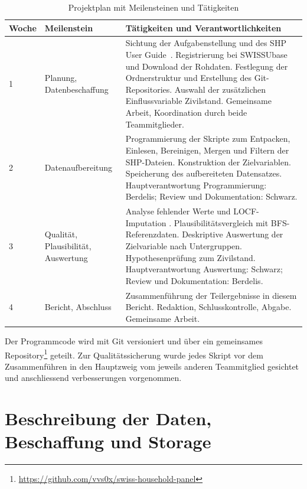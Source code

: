 \begin{table}[h]
\centering
\caption{Projektplan mit Meilensteinen und Tätigkeiten}
\label{tab:projektplan}
\begin{tabularx}{\textwidth}{p{1cm}p{2.8cm}X}
\toprule
Woche & Meilenstein & Tätigkeiten und Verantwortlichkeiten \\
\midrule
1 & Planung, Daten\-beschaffung &
Sichtung der Aufgabenstellung und des SHP User Guide~\cite{Voorpostel2018}.
Registrierung bei SWISSUbase und Download der Rohdaten.
Festlegung der Ordnerstruktur und Erstellung des Git-Repositories.
Auswahl der zusätzlichen Einflussvariable Zivilstand.
Gemeinsame Arbeit, Koordination durch beide Teammitglieder. \\
\midrule
2 & Daten\-aufbereitung &
Programmierung der Skripte zum Entpacken, Einlesen, Bereinigen, Mergen und Filtern der SHP-Dateien.
Konstruktion der Zielvariablen.
Speicherung des aufbereiteten Datensatzes.
Hauptverantwortung Programmierung: Berdelis; Review und Dokumentation: Schwarz. \\
\midrule
3 & Qualität, Plausibilität, Auswertung &
Analyse fehlender Werte und LOCF-Imputation \footnotemark.
Plausibilitätsvergleich mit BFS-Referenzdaten.
Deskriptive Auswertung der Zielvariable nach Untergruppen.
Hypothesenprüfung zum Zivilstand.
Hauptverantwortung Auswertung: Schwarz; Review und Dokumentation: Berdelis. \\
\midrule
4 & Bericht, \newline Abschluss &
Zusammenführung der Teilergebnisse in diesem Bericht.
Redaktion, Schlusskontrolle, Abgabe.
Gemeinsame Arbeit. \\
\bottomrule
\end{tabularx}
\end{table}
Der Programmcode wird mit Git versioniert und über ein gemeinsames Repository\footnote{\href{https://github.com/vvs0x/swiss-household-panel}{https://github.com/vvs0x/swiss-household-panel}} geteilt. Zur Qualitätssicherung
wurde jedes Skript vor dem Zusammenführen in den Hauptzweig vom jeweils anderen
Teammitglied gesichtet und anschliessend verbesserungen vorgenommen.

\newpage
\section{Beschreibung der Daten, Beschaffung und Storage}
\label{sec:daten}

